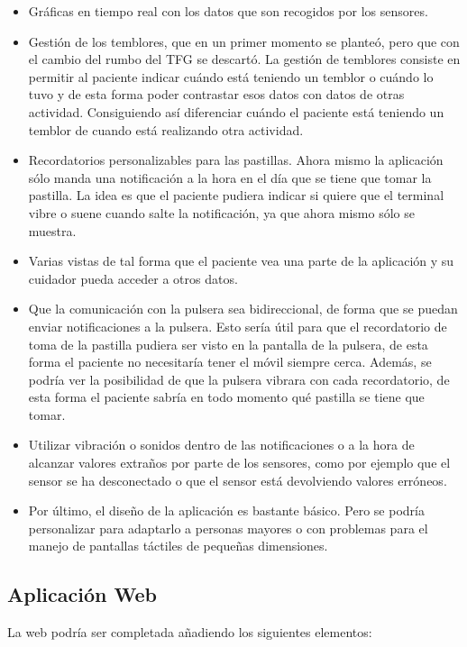 \documentclass[11pt,spanish]{article}
\begin{document}
\begin{itemize}
	\item Gráficas en tiempo real con los datos que son recogidos por los sensores.
    \item Gestión de los temblores, que en un primer momento se planteó, pero que con el cambio del rumbo del TFG se descartó. La gestión de temblores consiste en permitir al paciente indicar cuándo está teniendo un temblor o cuándo lo tuvo y de esta forma poder contrastar esos datos con datos de otras actividad. Consiguiendo así diferenciar cuándo el paciente está teniendo un temblor de cuando está realizando otra actividad.
    \item Recordatorios personalizables para las pastillas. Ahora mismo la aplicación sólo manda una notificación a la hora en el día que se tiene que tomar la pastilla. La idea es que el paciente pudiera indicar si quiere que el terminal vibre o suene cuando salte la notificación, ya que ahora mismo sólo se muestra.
    \item Varias vistas de tal forma que el paciente vea una parte de la aplicación y su cuidador pueda acceder a otros datos.
    \item Que la comunicación con la pulsera sea bidireccional, de forma que se puedan enviar notificaciones a la pulsera. Esto sería útil para que el recordatorio de toma de la pastilla pudiera ser visto en la pantalla de la pulsera, de esta forma el paciente no necesitaría tener el móvil siempre cerca. Además, se podría ver la posibilidad de que la pulsera vibrara con cada recordatorio, de esta forma el paciente sabría en todo momento qué pastilla se tiene que tomar.
    \item Utilizar vibración o sonidos dentro de las notificaciones o a la hora de alcanzar valores extraños por parte de los sensores, como por ejemplo que el sensor se ha desconectado o que el sensor está devolviendo valores erróneos.
    \item Por último, el diseño de la aplicación es bastante básico. Pero se podría personalizar para adaptarlo a personas mayores o con problemas para el manejo de pantallas táctiles de pequeñas dimensiones.
\end{itemize}

\subsection{Aplicación Web}
La web podría ser completada añadiendo los siguientes elementos:
\end{document}
